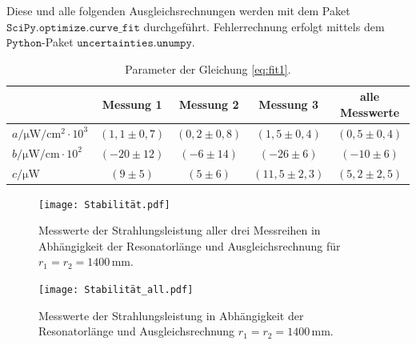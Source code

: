 Diese und alle folgenden Ausgleichsrechnungen werden mit dem Paket 
$\texttt{SciPy.optimize.curve\_fit}$ durchgeführt. 
Fehlerrechnung erfolgt mittels dem $\texttt{Python}$-Paket $\texttt{uncertainties.unumpy}$.
\FloatBarrier
\begin{table}[h]
    \centering
    \caption{Parameter der Gleichung \eqref{eq:fit1}.}
    \label{tab:atab2}
    \begin{tabular}{l c c c c}
        \toprule
        {} & {Messung 1} & {Messung 2} & {Messung 3} & {alle Messwerte} \\
        \midrule
        $a / \si{\micro\W\per\cm\squared}\cdot10^{3}$ & $(1,1 \pm 0,7)$ & $(0,2 \pm 0,8)$ & $(1,5 \pm 0,4)$ & $(0,5 \pm 0,4)$ \\
        $b / \si{\micro\W\per\cm}\cdot10^{2}$ & $(-20 \pm 12)$ & $(-6 \pm 14)$ & $(-26 \pm 6)$ & $(-10 \pm 6)$ \\
        $c / \si{\micro\W}$ & $(9 \pm 5)$ & $(5 \pm 6)$ & $(11,5 \pm 2,3)$ & $(5,2 \pm 2,5)$ \\
        \bottomrule
    \end{tabular}
\end{table}
\FloatBarrier
\noindent
\FloatBarrier
\begin{figure}[h]
\centering
\texttt{[image: Stabilität.pdf]}
\caption{Messwerte der Strahlungsleistung aller drei Messreihen in Abhängigkeit der Resonatorlänge und Ausgleichsrechnung für $r_1=r_2=1400\,\si{\mm}$.}
\label{fig:afig1}
\end{figure}
\FloatBarrier
\noindent
\FloatBarrier
\begin{figure}[h]
\centering
\texttt{[image: Stabilität\_all.pdf]}
\caption{Messwerte der Strahlungsleistung in Abhängigkeit der Resonatorlänge und Ausgleichsrechnung $r_1=r_2=1400\,\si{\mm}$.}
\label{fig:afig2}
\end{figure}
\FloatBarrier
\noindent




